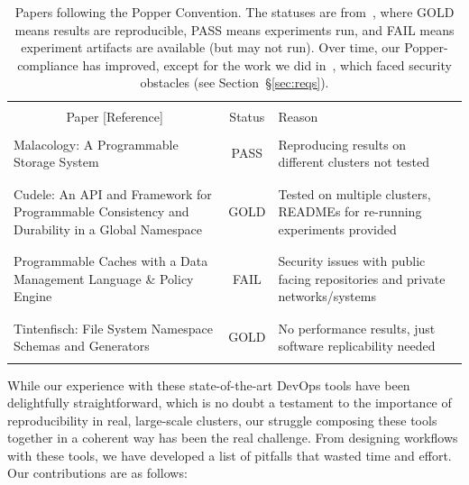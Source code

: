 \begin{table}[t]
\centering
\normalsize
\begin{tabular}{ >{}m{3.2in} | c | >{}m{2.9in} }
&\\
\multicolumn{1}{c|}{Paper [Reference]} & Status & Reason\\ \hline
&\\
Malacology: A Programmable Storage System~\cite{sevilla:eurosys17-malacology}
& PASS
& Reproducing results on different clusters not tested\\ 
&\\\hdashline
&\\
Cudele: An API and Framework for Programmable Consistency and Durability in a Global Namespace~\cite{sevilla:ipdps18-cudele}
& GOLD 
& Tested on multiple clusters, READMEs for re-running experiments provided\\
&\\\hdashline
&\\
Programmable Caches with a Data Management Language \& Policy Engine~\cite{sevilla:ccgrid18-parsplice}
& FAIL 
& Security issues with public facing repositories and private networks/systems\\
&\\\hdashline
&\\
Tintenfisch: File System Namespace Schemas and Generators~\cite{sevilla:techreport18-tintenfisch}
& GOLD 
& No performance results, just software replicability needed\\
&\\
\end{tabular}

\caption{Papers following the Popper Convention. The statuses are
from~\cite{jimenez:rr18-popper}, where GOLD means results are reproducible,
PASS means experiments run, and FAIL means experiment artifacts are available
(but may not run). Over time, our Popper-compliance has improved, except for
the work we did in~\cite{sevilla:ccgrid18-parsplice}, which faced security
obstacles (see Section~\S\ref{sec:reqs}).}

\label{table:papers}
\end{table}

While our experience with these state-of-the-art
DevOps tools have been delightfully straightforward, which is no doubt a
testament to the importance of reproducibility in real, large-scale clusters,
our struggle composing these tools together in a coherent way has been the real
challenge.  From designing workflows with these tools, we have developed a list
of pitfalls that wasted time and effort. Our contributions are as follows:

